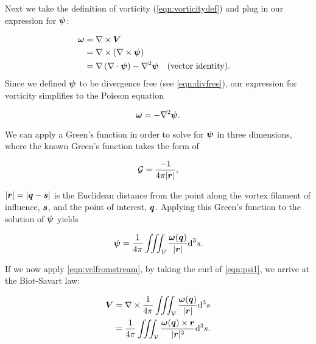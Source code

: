 Next we take the definition of vorticity (\cref{eqn:vorticitydef}) and plug in our expression for \(\bm{\psi}\):

\begin{equation}
    \begin{aligned}
        \bm{\omega} &= \nabla \times \bm{V} \\
         &= \nabla \times \left( \nabla \times \bm{\psi} \right) \\
         &= \nabla \left(\nabla \cdot \bm{\psi} \right) - \nabla^2 \bm{\psi} && \text{(vector identity)}.
    \end{aligned}
\end{equation}
%
Since we defined \(\bm{\psi}\) to be divergence free (see \cref{eqn:divfree}), our expression for vorticity simplifies to the Poisson equation

\begin{equation}
    \bm{\omega} = - \nabla^2 \bm{\psi}.
\end{equation}

We can apply a Green's function in order to solve for \(\bm{\psi}\) in three dimensions, where the known Green's function takes the form of

\begin{equation}
    \mathcal{G} = \frac{-1}{4\pi |\bm{r}|},
\end{equation}

\where \(|\bm{r}| = |\bm{q} - \bm{s}|\) is the Euclidean distance from the point along the vortex filament of influence, \(\bm{s}\), and the point of interest, \(\bm{q}\).
%
Applying this Green's function to the solution of \(\bm{\psi}\) yields

\begin{equation}
    \label{eqn:psi1}
    \bm{\psi} = \frac{1}{4\pi} \iiint_{\mathcal{V}} \frac{\bm{\omega}(\bm{q})}{|\bm{r}|} \mathrm{d}^3s.
\end{equation}

If we now apply \cref{eqn:velfromstream}, by taking the curl of \cref{eqn:psi1}, we arrive at the Biot-Savart law:

\begin{equation}
    \label{eqn:biotsavart}
    \begin{aligned}
        \bm{V} &=\nabla \times \frac{1}{4\pi} \iiint_{\mathcal{V}} \frac{\bm{\omega}(\bm{q})}{|\bm{r}|} \mathrm{d}^3s \\
                 &= \frac{1}{4\pi} \iiint_{\mathcal{V}} \frac{\bm{\omega}(\bm{q}) \times \bm{r}}{|\bm{r}|^3} \mathrm{d}^3s.
    \end{aligned}
\end{equation}







